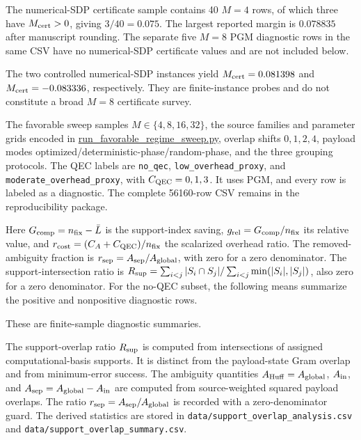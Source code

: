 The numerical-SDP certificate sample contains 40 $M=4$ rows, of which three have $M_{\rm cert}>0$, giving $3/40=0.075$. The largest reported margin is $0.078835$ after manuscript rounding. The separate five $M=8$ PGM diagnostic rows in the same CSV have no numerical-SDP certificate values and are not included below.
\begin{landscape}\scriptsize


\end{landscape}

The two controlled numerical-SDP instances yield $M_{\rm cert}=0.081398$ and $M_{\rm cert}=-0.083336$, respectively. They are finite-instance probes and do not constitute a broad $M=8$ certificate survey.


The favorable sweep samples $M\in\{4,8,16,32\}$, the source families and parameter grids encoded in \url{run_favorable_regime_sweep.py}, overlap shifts $0,1,2,4$, payload modes optimized/deterministic-phase/random-phase, and the three grouping protocols. The QEC labels are \texttt{no\_qec}, \texttt{low\_overhead\_proxy}, and \texttt{moderate\_overhead\_proxy}, with $C_{\rm QEC}=0,1,3$. It uses PGM, and every row is labeled as a diagnostic. The complete 56160-row CSV remains in the reproducibility package.

Here $G_{\rm comp}=n_{\rm fix}-\bar L$ is the support-index saving, $g_{\rm rel}=G_{\rm comp}/n_{\rm fix}$ its relative value, and $r_{\rm cost}=(C_A+C_{\rm QEC})/n_{\rm fix}$ the scalarized overhead ratio. The removed-ambiguity fraction is $r_{\rm sep}=A_{\rm sep}/A_{\rm global}$, with zero for a zero denominator. The support-intersection ratio is $R_{\rm sup}=\sum_{i<j}|S_i\cap S_j|/\sum_{i<j}\min(|S_i|,|S_j|)$, also zero for a zero denominator. For the no-QEC subset, the following means summarize the positive and nonpositive diagnostic rows.

These are finite-sample diagnostic summaries.

The support-overlap ratio $R_{\rm sup}$ is computed from intersections of assigned computational-basis supports. It is distinct from the payload-state Gram overlap and from minimum-error success. The ambiguity quantities $A_{\rm Huff}=A_{\rm global}$, $A_{\rm in}$, and $A_{\rm sep}=A_{\rm global}-A_{\rm in}$ are computed from source-weighted squared payload overlaps. The ratio $r_{\rm sep}=A_{\rm sep}/A_{\rm global}$ is recorded with a zero-denominator guard. The derived statistics are stored in \texttt{data/support\_overlap\_analysis.csv} and \texttt{data/support\_overlap\_summary.csv}.

